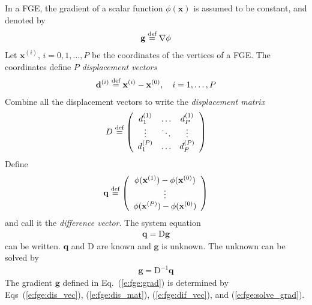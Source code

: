\documentclass[11pt,dvips]{article}
\numberwithin{equation}{section}
\newcommand{\defeq}{\ensuremath{\buildrel {\text{def}}\over{=}}}
\begin{document}
In a FGE, the gradient of a scalar function $\phi(\mathbf{x})$ is assumed to be
constant, and denoted by
\begin{align}
  \mathbf{g} \defeq \nabla\phi \label{e:fge:grad}
\end{align}
Let $\mathbf{x}^{(i)}$, $i = 0, 1, \ldots, P$ be the coordinates of the
vertices of a FGE.  The coordinates define $P$ \textit{displacement vectors}
\begin{align}
  \mathbf{d}^{(i)} \defeq \mathbf{x}^{(i)} - \mathbf{x}^{(0)},
  \quad i = 1, \ldots, P \label{e:fge:dis_vec}
\end{align}
Combine all the displacement vectors to write the \textit{displacement matrix}
\begin{align}
  D \defeq \left(\begin{array}{ccc}
    d^{(1)}_1 & \hdots & d^{(1)}_P \\
    \vdots & \ddots & \vdots \\
    d^{(P)}_1 & \hdots & d^{(P)}_P
  \end{array}\right) \label{e:fge:dis_mat}
\end{align}
Define
\begin{align}
  \mathbf{q} \defeq \left(\begin{array}{c}
    \phi(\mathbf{x}^{(1)}) - \phi(\mathbf{x}^{(0)}) \\
    \vdots \\
    \phi(\mathbf{x}^{(P)}) - \phi(\mathbf{x}^{(0)})
  \end{array}\right) \label{e:fge:dif_vec}
\end{align}
and call it the \textit{difference vector}.  The system equation
\begin{align*}
  \mathbf{q} = \mathrm{D}\mathbf{g}
\end{align*}
can be written.  $\mathbf{q}$ and $\mathrm{D}$ are known and $\mathbf{g}$ is
unknown.  The unknown can be solved by
\begin{align}
  \mathbf{g} = \mathrm{D}^{-1}\mathbf{q} \label{e:fge:solve_grad}
\end{align}
The gradient $\mathbf{g}$ defined in Eq.~(\ref{e:fge:grad}) is determined by
Eqs~(\ref{e:fge:dis_vec}), (\ref{e:fge:dis_mat}), (\ref{e:fge:dif_vec}), and
(\ref{e:fge:solve_grad}).

\clearpage


\end{document}
